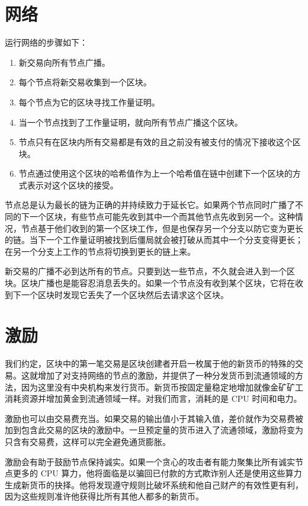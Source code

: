 \documentclass{article}
\begin{document}
\section{网络}
运行网络的步骤如下：

\begin{enumerate}
 \item 新交易向所有节点广播。
 \item 每个节点将新交易收集到一个区块。
 \item 每个节点为它的区块寻找工作量证明。
 \item 当一个节点找到了工作量证明，就向所有节点广播这个区块。
 \item 节点只有在区块内所有交易都是有效的且之前没有被支付的情况下接收这个区块。
 \item 节点通过使用这个区块的哈希值作为上一个哈希值在链中创建下一个区块的方式表示对这个区块的接受。
\end{enumerate}

节点总是认为最长的链为正确的并持续致力于延长它。如果两个节点同时广播了不同的下一个区块，有些节点可能先收到其中一个而其他节点先收到另一个。这种情况，节点基于他们收到的第一个区块工作，但是也保存另一个分支以防它变为更长的链。当下一个工作量证明被找到后僵局就会被打破从而其中一个分支变得更长；在另一个分支上工作的节点将切换到更长的链上来。

新交易的广播不必到达所有的节点。只要到达一些节点，不久就会进入到一个区块。区块广播也是能容忍消息丢失的。如果一个节点没有收到某个区块，它将在收到下一个区块时发现它丢失了一个区块然后去请求这个区块。

\section{激励}
我们约定，区块中的第一笔交易是区块创建者开启一枚属于他的新货币的特殊的交易。这就增加了对支持网络的节点的激励，并提供了一种分发货币到流通领域的方法，因为这里没有中央机构来发行货币。新货币按固定量稳定地增加就像金矿矿工消耗资源并增加黄金到流通领域一样。对我们而言，消耗的是 CPU 时间和电力。

激励也可以由交易费充当。如果交易的输出值小于其输入值，差价就作为交易费被加到包含此交易的区块的激励中。一旦预定量的货币进入了流通领域，激励将变为只含有交易费，这样可以完全避免通货膨胀。

激励会有助于鼓励节点保持诚实。如果一个贪心的攻击者有能力聚集比所有诚实节点更多的 CPU 算力，他将面临是以骗回已付款的方式欺诈别人还是使用这些算力生成新货币的抉择。他将发现遵守规则比破坏系统和他自己财产的有效性更有利，因为这些规则准许他获得比所有其他人都多的新货币。
\end{document}
